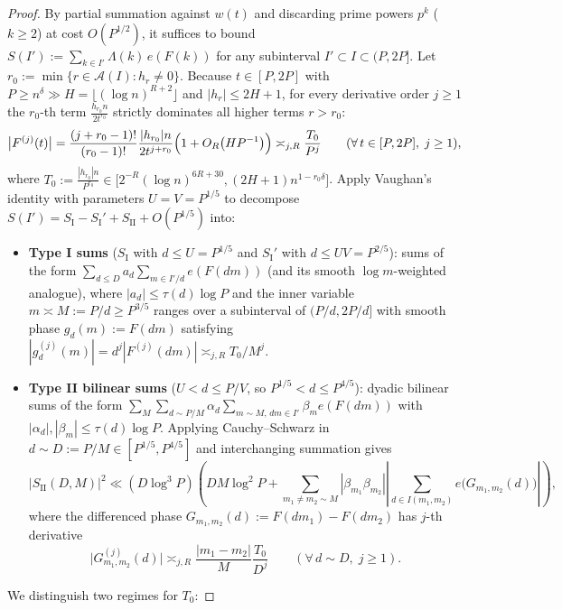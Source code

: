 \documentclass[11pt,reqno]{amsart}
\theoremstyle{remark}
\numberwithin{equation}{section}
\begin{document}
\begin{proof}
By partial summation against $w(t)$ and discarding prime powers $p^k$ ($k \ge 2$) at cost $O(P^{1/2})$, it suffices to bound $S(I') := \sum_{k \in I'} \Lambda(k)\,e(F(k))$ for any subinterval $I' \subset I \subset (P, 2P]$. Let $r_0 := \min\{r \in \mathcal{A}(I) : h_r \ne 0\}$. Because $t \in [P, 2P]$ with $P \ge n^\delta \gg H = \lfloor (\log n)^{R+2} \rfloor$ and $|h_r| \le 2H + 1$, for every derivative order $j \ge 1$ the $r_0$-th term $\frac{h_{r_0} n}{2t^{r_0}}$ strictly dominates all higher terms $r > r_0$:
\[
\bigl|F^{(j)}(t)\bigr| = \frac{(j + r_0 - 1)!}{(r_0 - 1)!} \frac{|h_{r_0}|n}{2t^{j+r_0}} \Bigl(1 + O_R\bigl(HP^{-1}\bigr)\Bigr) \asymp_{j,R} \frac{T_0}{P^j} \qquad (\forall\, t \in [P, 2P],\; j \ge 1),
\]
where $T_0 := \frac{|h_{r_0}|n}{P^{r_0}} \in \bigl[2^{-R}(\log n)^{6R+30}, (2H + 1)n^{1-r_0\delta}\bigr]$. Apply Vaughan's identity \cite[Proposition~13.4]{IwaniecKowalski2004} with parameters $U = V = P^{1/5}$ to decompose $S(I') = S_{\mathrm{I}} - S_{\mathrm{I}}' + S_{\mathrm{II}} + O(P^{1/5})$ into:
\begin{itemize}
\item \textbf{Type I sums} ($S_{\mathrm{I}}$ with $d \le U = P^{1/5}$ and $S_{\mathrm{I}}'$ with $d \le UV = P^{2/5}$): sums of the form $\sum_{d \le D} a_d \sum_{m \in I'/d} e(F(dm))$ (and its smooth $\log m$-weighted analogue), where $|a_d| \le \tau(d)\log P$ and the inner variable $m \asymp M := P/d \ge P^{3/5}$ ranges over a subinterval of $(P/d, 2P/d]$ with smooth phase $g_d(m) := F(dm)$ satisfying $|g_d^{(j)}(m)| = d^j |F^{(j)}(dm)| \asymp_{j,R} T_0 / M^j$.
\item \textbf{Type II bilinear sums} ($U < d \le P/V$, so $P^{1/5} < d \le P^{4/5}$): dyadic bilinear sums of the form $\sum_M \sum_{d \sim P/M} \alpha_d \sum_{m \sim M,\, dm \in I'} \beta_m e(F(dm))$ with $|\alpha_d|, |\beta_m| \le \tau(d)\log P$. Applying Cauchy--Schwarz in $d \sim D := P/M \in [P^{1/5}, P^{4/5}]$ and interchanging summation gives
\[
\bigl|S_{\mathrm{II}}(D, M)\bigr|^2 \ll (D\log^3 P)\left(DM\log^2 P + \sum_{m_1 \ne m_2 \sim M} |\beta_{m_1}\beta_{m_2}| \left|\sum_{d \in I(m_1,m_2)} e\bigl(G_{m_1,m_2}(d)\bigr)\right|\right),
\]
where the differenced phase $G_{m_1,m_2}(d) := F(dm_1) - F(dm_2)$ has $j$-th derivative
\[
\bigl|G_{m_1,m_2}^{(j)}(d)\bigr| \asymp_{j,R} \frac{|m_1 - m_2|}{M} \frac{T_0}{D^j} \qquad (\forall\, d \sim D,\; j \ge 1).
\]
\end{itemize}
We distinguish two regimes for $T_0$:


\end{proof}
\end{document}
